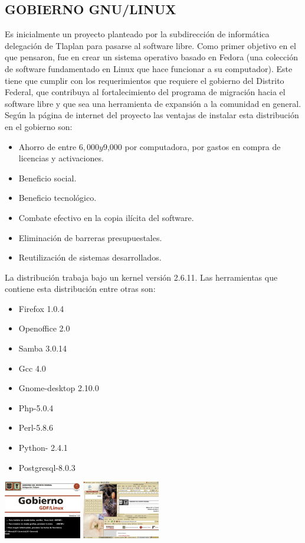 \subsection*{GOBIERNO GNU/LINUX}
Es inicialmente un proyecto planteado por la subdirección de
informática delegación de Tlaplan para pasarse al software libre.
Como primer objetivo en el que pensaron, fue en crear un 
sistema operativo basado en Fedora (una colección de software
fundamentado en Linux que hace funcionar a su computador).
Este tiene que cumplir con los requerimientos que requiere el
gobierno del Distrito Federal, que contribuya al fortalecimiento
del programa de migración hacia el software libre y que sea una
herramienta de expansión a la comunidad en general.
Según la página de internet del proyecto las ventajas de instalar
esta distribución en el gobierno son:
\begin{itemize}
  \item Ahorro de entre $6,000 y $9,000 por computadora, por
	gastos en compra de licencias y activaciones.
  \item Beneficio social.
  \item Beneficio tecnológico.
  \item Combate efectivo en la copia ilícita del software.
  \item Eliminación de barreras presupuestales.
  \item Reutilización de sistemas desarrollados.
\end{itemize}
La distribución trabaja bajo un kernel versión 2.6.11. Las
herramientas que contiene esta distribución entre otras
son:
\begin{itemize}
  \item Firefox 1.0.4
  \item Openoffice 2.0
  \item Samba 3.0.14
  \item Gcc 4.0
  \item Gnome-desktop 2.10.0
  \item Php-5.0.4
  \item Perl-5.8.6
  \item Python- 2.4.1
  \item Postgresql-8.0.3
\end{itemize}
\includegraphics[scale=0.5]{img/cp06/img0604.png}
\includegraphics[scale=0.5]{img/cp06/img0605.png}

